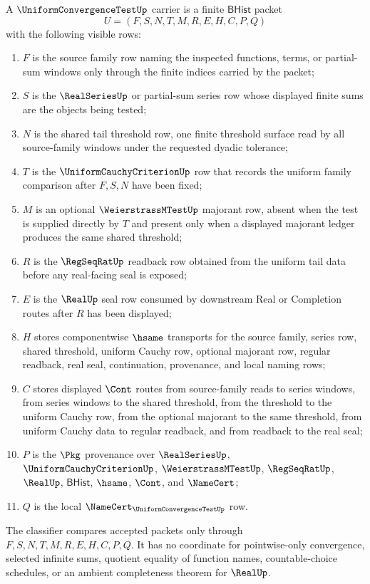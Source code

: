 \begin{definition}
\label{def:uniform-convergence-test-carrier}
A $\UniformConvergenceTestUp$ carrier is a finite $\mathsf{BHist}$ packet
$$
U=(F,S,N,T,M,R,E,H,C,P,Q)
$$
with the following visible rows:
\begin{enumerate}
\item $F$ is the source family row naming the inspected functions, terms, or partial-sum windows only through the finite indices carried by the packet;
\item $S$ is the $\RealSeriesUp$ or partial-sum series row whose displayed finite sums are the objects being tested;
\item $N$ is the shared tail threshold row, one finite threshold surface read by all source-family windows under the requested dyadic tolerance;
\item $T$ is the $\UniformCauchyCriterionUp$ row that records the uniform family comparison after $F,S,N$ have been fixed;
\item $M$ is an optional $\WeierstrassMTestUp$ majorant row, absent when the test is supplied directly by $T$ and present only when a displayed majorant ledger produces the same shared threshold;
\item $R$ is the $\RegSeqRatUp$ readback row obtained from the uniform tail data before any real-facing seal is exposed;
\item $E$ is the $\RealUp$ seal row consumed by downstream Real or Completion routes after $R$ has been displayed;
\item $H$ stores componentwise $\hsame$ transports for the source family, series row, shared threshold, uniform Cauchy row, optional majorant row, regular readback, real seal, continuation, provenance, and local naming rows;
\item $C$ stores displayed $\Cont$ routes from source-family reads to series windows, from series windows to the shared threshold, from the threshold to the uniform Cauchy row, from the optional majorant to the same threshold, from uniform Cauchy data to regular readback, and from readback to the real seal;
\item $P$ is the $\Pkg$ provenance over $\RealSeriesUp$, $\UniformCauchyCriterionUp$, $\WeierstrassMTestUp$, $\RegSeqRatUp$, $\RealUp$, $\mathsf{BHist}$, $\hsame$, $\Cont$, and $\NameCert$;
\item $Q$ is the local $\NameCert_{\UniformConvergenceTestUp}$ row.
\end{enumerate}
The classifier compares accepted packets only through $F,S,N,T,M,R,E,H,C,P,Q$. It has no coordinate for pointwise-only convergence, selected infinite sums, quotient equality of function names, countable-choice schedules, or an ambient completeness theorem for $\RealUp$.
\end{definition}

